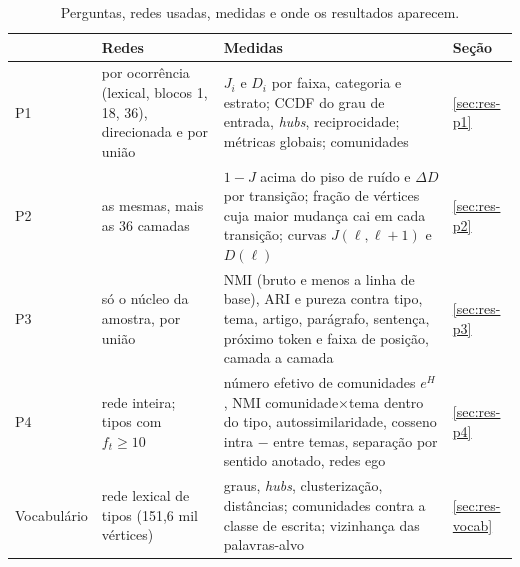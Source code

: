 \begin{table}[htbp]
\centering
\caption{Perguntas, redes usadas, medidas e onde os resultados aparecem.}\label{tab:perguntas}
\small
\begin{tabularx}{\linewidth}{@{}l >{\raggedright\arraybackslash}p{3.6cm} X l@{}}
\toprule
& \textbf{Redes} & \textbf{Medidas} & \textbf{Seção} \\
\midrule
P1 & por ocorrência (lexical, blocos 1, 18, 36), direcionada e por união &
$J_i$ e $D_i$ por faixa, categoria e estrato; CCDF do grau de entrada, \emph{hubs},
reciprocidade; métricas globais; comunidades & \ref{sec:res-p1} \\
P2 & as mesmas, mais as 36 camadas &
$1-J$ acima do piso de ruído e $\Delta D$ por transição; fração de vértices cuja maior mudança
cai em cada transição; curvas $J(\ell,\ell+1)$ e $D(\ell)$ & \ref{sec:res-p2} \\
P3 & só o núcleo da amostra, por união &
NMI (bruto e menos a linha de base), ARI e pureza contra tipo, tema, artigo, parágrafo,
sentença, próximo token e faixa de posição, camada a camada & \ref{sec:res-p3} \\
P4 & rede inteira; tipos com $f_t\ge10$ &
número efetivo de comunidades $e^{H}$, NMI comunidade$\times$tema dentro do tipo,
autossimilaridade, cosseno intra $-$ entre temas, separação por sentido anotado, redes ego &
\ref{sec:res-p4} \\
Vocabulário & rede lexical de tipos (151,6 mil vértices) &
graus, \emph{hubs}, clusterização, distâncias; comunidades contra a classe de escrita;
vizinhança das palavras-alvo & \ref{sec:res-vocab} \\
\bottomrule
\end{tabularx}
\end{table}
